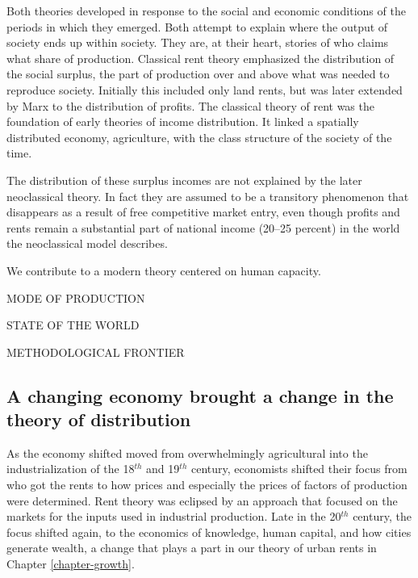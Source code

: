 Both theories developed in response to the social and economic conditions of the periods in which they emerged. Both attempt to explain where the output of society ends up within society. They are, at their heart, stories of who %
claims what share of production. Classical rent theory emphasized the distribution of the social \gls{surplus}, the part of production over and above what was needed to reproduce society. Initially this included only land rents, but was later extended by Marx to the distribution of profits.
The classical theory of rent was the foundation of early %
theories of income distribution. It linked a spatially distributed economy, agriculture, with the class structure of the society of the time. 

The distribution of these surplus incomes are not explained by the later neoclassical theory. In fact they are assumed to be a transitory phenomenon that disappears as a result of free competitive market entry, even though profits and rents remain a substantial part of national income (20–25 percent) \cite{GET_Britannica} %
in the world the neoclassical model describes. 



We contribute to a modern theory centered on human capacity.

MODE OF PRODUCTION

STATE OF THE WORLD

METHODOLOGICAL FRONTIER

\subsection{A changing economy brought a change in the theory of distribution}
As the economy shifted  moved from overwhelmingly  agricultural into the industrialization of the 18$^{th}$  and 19$^{th}$ century, economists shifted their focus from who got the rents to how prices and especially the prices of factors of production were determined. Rent theory was eclipsed by an approach that focused on the markets for the inputs used in industrial production.  Late in the 20$^{th}$ century, the focus shifted again, to the economics of  knowledge, human capital, and how cities generate wealth, a change that plays a part in  our theory of urban rents in Chapter \ref{chapter-growth}. 
 
